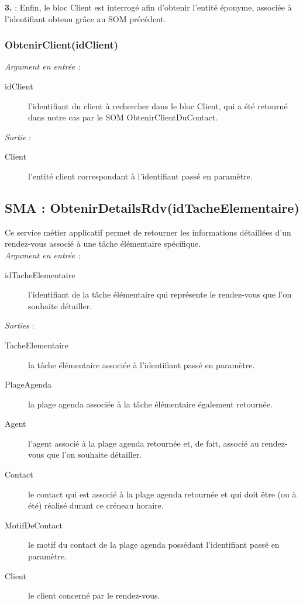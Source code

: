 \begin{shaded}
\textbf{3.} : Enfin, le bloc Client est interrogé afin d'obtenir l'entité éponyme, associée à l'identifiant obtenu grâce au SOM précédent.
\end{shaded}

\subsubsection{ObtenirClient(idClient)}

\noindent \textit{Argument en entrée :}
\begin{description}
\item[idClient] l'identifiant du client à rechercher dans le bloc Client, qui a été retourné dans notre cas par le SOM ObtenirClientDuContact. \\
\end{description}

\noindent \textit{Sortie} :
\begin{description}
\item[Client] l'entité client correspondant à l'identifiant passé en paramètre. \\
\end{description}

\subsection{SMA : ObtenirDetailsRdv(idTacheElementaire)} 

Ce service métier applicatif permet de retourner les informations détaillées d'un rendez-vous associé à une tâche élémentaire spécifique.\\

\noindent \textit{Argument en entrée :}
\begin{description}
\item[idTacheElementaire] l'identifiant de la tâche élémentaire qui représente le rendez-vous que l'on souhaite détailler. \\
\end{description}

\noindent \textit{Sorties} : 
\begin{description}
\item[TacheElementaire] la tâche élémentaire associée à l'identifiant passé en paramètre.
\item[PlageAgenda] la plage agenda associée à la tâche élémentaire également retournée.
\item[Agent] l'agent associé à la plage agenda retournée et, de fait, associé au rendez-vous que l'on souhaite détailler. 
\item[Contact] le contact qui est associé à la plage agenda retournée et qui doit être (ou à été) réalisé durant ce créneau horaire.
\item[MotifDeContact] le motif du contact de la plage agenda possédant l'identifiant passé en paramètre. 
\item[Client] le client concerné par le rendez-vous. \\
\end{description}


